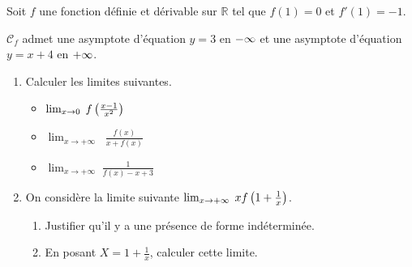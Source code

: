 \begin{exercice}

 Soit $ f $ une  fonction  définie et dérivable sur\;  $\mathbb{R} $ \;  tel que $ f(1)=0 $ \;  et  \; $ f'(1)=-1 $.
 

 
  $ \mathcal{C}_{f} $ admet  une asymptote d'équation $ y=3 $  en $ -\infty $  et une asymptote d'équation $ y=x+4 $  en $ +\infty $.

\begin{enumerate}
\item Calculer les limites suivantes.

\begin{itemize}
\item $ \lim_{x \to 0}\; f\left(\frac{x-1}{x^2}\right)$
\item $ \lim_{x \to +\infty}\;\;\frac{f(x)}{ x+f(x)}$
\item $ \lim_{x \to +\infty}\; \frac{1}{f(x)-x+3}$
\end{itemize}


\item On considère  la limite  suivante  $ \lim_{x \to +\infty}\; xf\left(1+\frac{1}{x}\right)$.
\begin{enumerate}
\item Justifier qu'il y a une présence de forme indéterminée.
\item En posant $ X=1+\frac{1}{x} $,   calculer cette limite.
\end{enumerate}
\end{enumerate}


\end{exercice}

